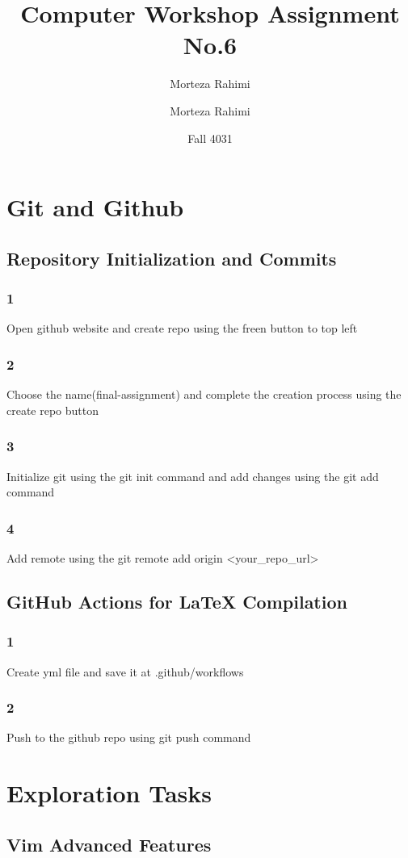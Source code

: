 \documentclass[30px]{article}
\title{{\tfont Computer Workshop Assignment No.6}}
\author{Morteza Rahimi}
\affil{Iran University of Science and Technology}
\date{Fall 4031}
\author{Morteza Rahimi}
\begin{document}
\maketitle
\newpage
\tableofcontents
\newpage
\section{Git and Github}
\subsection{Repository Initialization and Commits}
\subsubsection*{1} Open github website and create repo using the freen button to top left
\subsubsection*{2} Choose the name(final-assignment) and complete the creation process using the create repo button
\subsubsection*{3} Initialize git using the git init command and add changes using the git add command
\subsubsection*{4} Add remote using the git remote add origin <your_repo_url>
\subsection{GitHub Actions for LaTeX Compilation}
\subsubsection*{1} Create yml file and save it at .github/workflows
\subsubsection*{2} Push to the github repo using git push command

\section{Exploration Tasks}
\subsection{Vim Advanced Features}
\end{document}
